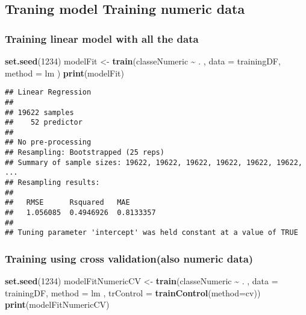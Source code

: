 \documentclass[
]{article}
\newenvironment{Shaded}{\begin{snugshade}}{\end{snugshade}}
\newcommand{\AttributeTok}[1]{\textcolor[rgb]{0.13,0.29,0.53}{#1}}
\newcommand{\DecValTok}[1]{\textcolor[rgb]{0.00,0.00,0.81}{#1}}
\newcommand{\FunctionTok}[1]{\textcolor[rgb]{0.13,0.29,0.53}{\textbf{#1}}}
\newcommand{\NormalTok}[1]{#1}
\newcommand{\OtherTok}[1]{\textcolor[rgb]{0.56,0.35,0.01}{#1}}
\newcommand{\SpecialCharTok}[1]{\textcolor[rgb]{0.81,0.36,0.00}{\textbf{#1}}}
\newcommand{\StringTok}[1]{\textcolor[rgb]{0.31,0.60,0.02}{#1}}
\begin{document}
\subsection{Traning model Training numeric
data}\label{traning-model-training-numeric-data}

\subsubsection{Training linear model with all the
data}\label{training-linear-model-with-all-the-data}

\begin{Shaded}
\begin{Highlighting}[]
\FunctionTok{set.seed}\NormalTok{(}\DecValTok{1234}\NormalTok{)}
\NormalTok{modelFit }\OtherTok{\textless{}{-}} \FunctionTok{train}\NormalTok{(classeNumeric }\SpecialCharTok{\textasciitilde{}}\NormalTok{ . , }\AttributeTok{data =}\NormalTok{ trainingDF, }\AttributeTok{method =} \StringTok{\textquotesingle{}lm\textquotesingle{}}\NormalTok{ )}
\FunctionTok{print}\NormalTok{(modelFit)}
\end{Highlighting}
\end{Shaded}

\begin{verbatim}
## Linear Regression 
## 
## 19622 samples
##    52 predictor
## 
## No pre-processing
## Resampling: Bootstrapped (25 reps) 
## Summary of sample sizes: 19622, 19622, 19622, 19622, 19622, 19622, ... 
## Resampling results:
## 
##   RMSE      Rsquared   MAE      
##   1.056085  0.4946926  0.8133357
## 
## Tuning parameter 'intercept' was held constant at a value of TRUE
\end{verbatim}

\subsubsection{Training using cross validation(also numeric
data)}\label{training-using-cross-validationalso-numeric-data}

\begin{Shaded}
\begin{Highlighting}[]
\FunctionTok{set.seed}\NormalTok{(}\DecValTok{1234}\NormalTok{)}
\NormalTok{modelFitNumericCV }\OtherTok{\textless{}{-}} \FunctionTok{train}\NormalTok{(classeNumeric }\SpecialCharTok{\textasciitilde{}}\NormalTok{ . , }\AttributeTok{data =}\NormalTok{ trainingDF, }\AttributeTok{method =} \StringTok{\textquotesingle{}lm\textquotesingle{}}\NormalTok{ , }\AttributeTok{trControl =} \FunctionTok{trainControl}\NormalTok{(}\AttributeTok{method=}\StringTok{\textquotesingle{}cv\textquotesingle{}}\NormalTok{))}
\FunctionTok{print}\NormalTok{(modelFitNumericCV)}
\end{Highlighting}
\end{Shaded}
\end{document}
